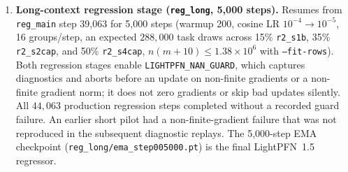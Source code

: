 \documentclass[11pt]{article}
\begin{document}
\begin{enumerate}
second, warm-starting V15 regression from a pretrained classification checkpoint reduced 2,000-step D3-reg CRPS by $-10.1\%$ raw ($-15.5\%$ EMA: 0.2122 vs.\ 0.2490) relative to training from scratch, matching 18,000 steps of scratch training in 2,000 steps and reaching 0.1975 EMA CRPS at 10,000 steps. %
We therefore initialize \texttt{reg\_main} from the final \texttt{cls\_long} EMA checkpoint (\texttt{--init}) and fine-tune the network with $4{,}772{,}519$ stored parameters for $39{,}063$ steps $\times 64$ tasks/step $= 2{,}500{,}032$ task draws (13 streamed pools of $105{,}216$ \texttt{r2} graph~v3 tasks each, $1.37\times 10^6$ unique tasks, warmup 200, cosine LR $10^{-3}\to 10^{-4}$, $400{,}000$ cells/GPU, $\texttt{--cat-mask-drop 0}$). %
\item \textbf{Long-context regression stage (\texttt{reg\_long}, 5,000 steps).}
Resumes from \texttt{reg\_main} step 39,063 for 5,000 steps (warmup 200, cosine LR $10^{-4}\to 10^{-5}$, 16 groups/step, an expected $288{,}000$ task draws across 15\% \texttt{r2\_s1b}, 35\% \texttt{r2\_s2cap}, and 50\% \texttt{r2\_s4cap}, $n(m+10)\le 1.38\times 10^6$ with \texttt{--fit-rows}). %
Both regression stages enable \texttt{LIGHTPFN\_NAN\_GUARD}, which captures diagnostics and aborts before an update on non-finite gradients or a non-finite gradient norm; it does not zero gradients or skip bad updates silently. All $44{,}063$ production regression steps completed without a recorded guard failure. An earlier short pilot had a non-finite-gradient failure that was not reproduced in the subsequent diagnostic replays. %
The 5,000-step EMA checkpoint (\texttt{reg\_long/ema\_step005000.pt}) is the final LightPFN~1.5 regressor.
\end{enumerate}
\end{document}
